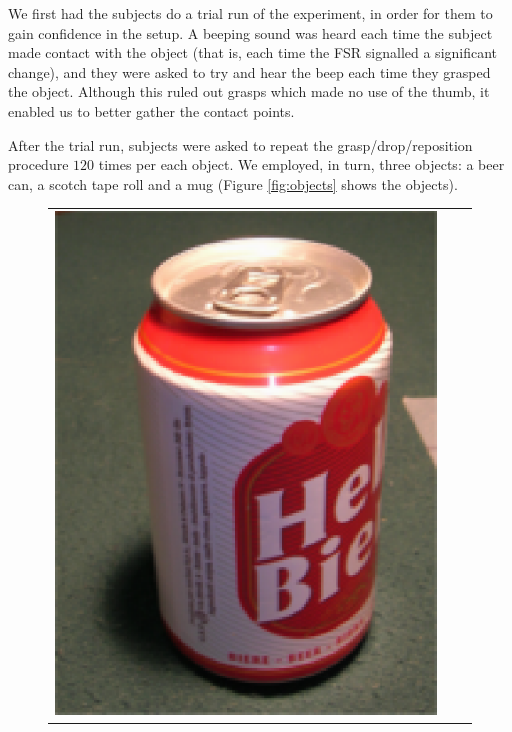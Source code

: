 We first had the subjects do a trial run of the experiment, in order
for them to gain confidence in the setup. A beeping sound was heard
each time the subject made contact with the object (that is, each time
the FSR signalled a significant change), and they were asked to try
and hear the beep each time they grasped the object. Although this
ruled out grasps which made no use of the thumb, it enabled us to
better gather the contact points.

After the trial run, subjects were asked to repeat the
grasp/drop/reposition procedure $120$ times per each object. We
employed, in turn, three objects: a beer can, a scotch tape roll and a
mug (Figure \ref{fig:objects} shows the objects).

\begin{figure}[htbp]
  \begin{center}
    \begin{tabular}{ccc}
      \includegraphics[height=0.2\textheight]{beer.eps} &

\end{tabular}
\end{center}
\end{figure}

